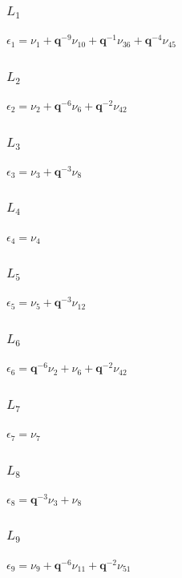 \subsubsection*{$L_{1}$}
$
\epsilon_{1} = \nu_{1} + \boldsymbol{q}^{-9}\nu_{10} + \boldsymbol{q}^{-1}\nu_{36} + \boldsymbol{q}^{-4}\nu_{45}
$

\subsubsection*{$L_{2}$}
$
\epsilon_{2} = \nu_{2} + \boldsymbol{q}^{-6}\nu_{6} + \boldsymbol{q}^{-2}\nu_{42}
$

\subsubsection*{$L_{3}$}
$
\epsilon_{3} = \nu_{3} + \boldsymbol{q}^{-3}\nu_{8}
$

\subsubsection*{$L_{4}$}
$
\epsilon_{4} = \nu_{4}
$

\subsubsection*{$L_{5}$}
$
\epsilon_{5} = \nu_{5} + \boldsymbol{q}^{-3}\nu_{12}
$

\subsubsection*{$L_{6}$}
$
\epsilon_{6} = \boldsymbol{q}^{-6}\nu_{2} + \nu_{6} + \boldsymbol{q}^{-2}\nu_{42}
$

\subsubsection*{$L_{7}$}
$
\epsilon_{7} = \nu_{7}
$

\subsubsection*{$L_{8}$}
$
\epsilon_{8} = \boldsymbol{q}^{-3}\nu_{3} + \nu_{8}
$

\subsubsection*{$L_{9}$}
$
\epsilon_{9} = \nu_{9} + \boldsymbol{q}^{-6}\nu_{11} + \boldsymbol{q}^{-2}\nu_{51}
$


